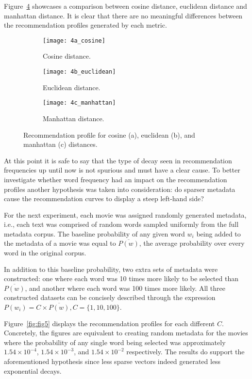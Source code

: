 Figure~\ref{fig:fig4} showcases a comparison between cosine distance, euclidean
distance and manhattan distance. It is clear that there are no meaningful
differences between the recommendation profiles generated by each metric.

\begin{figure}
  \centering
  \begin{subfigure}{0.3\textwidth}
    \centering
    \texttt{[image: 4a\_cosine]}
    \caption{Cosine distance.\label{fig:fig4a}}
  \end{subfigure}
  \begin{subfigure}{0.3\textwidth}
    \centering
    \texttt{[image: 4b\_euclidean]}
    \caption{Euclidean distance.\label{fig:fig4b}}
  \end{subfigure}
  \begin{subfigure}{0.3\textwidth}
    \centering
    \texttt{[image: 4c\_manhattan]}
    \caption{Manhattan distance.\label{fig:fig4c}}
  \end{subfigure}
  \caption{Recommendation profile for cosine (a), euclidean (b), and manhattan
    (c) distances.\label{fig:fig4}}
\end{figure}

At this point it is safe to say that the type of decay seen in recommendation
frequencies up until now is not spurious and must have a clear cause. To better
investigate whether word frequency had an impact on the recommendation profiles
another hypothesis was taken into consideration: do sparser metadata cause the
recommendation curves to display a steep left-hand side?

For the next experiment, each movie was assigned randomly generated metadata,
i.e., each text was comprised of random words sampled uniformly from the full
metadata corpus. The baseline probability of any given word $w_i$ being added to
the metadata of a movie was equal to $\overline{P(w)}$, the average probability
over every word in the original corpus.

In addition to this baseline probability, two extra sets of metadata were
constructed: one where each word was 10 times more likely to be selected than
$\overline{P(w)}$, and another where each word was 100 times more likely. All
three constructed datasets can be concisely described through the expression
$P(w_i) = C \times \overline{P(w)}, C = \{1, 10, 100\}$.

Figure~\ref{fig:fig5} displays the recommendation profiles for each different
$C$. Concretely, the figures are equivalent to creating random metadata for the
movies where the probability of any single word being selected was approximately
$1.54 \times 10^{-4}$, $1.54 \times 10^{-3}$, and $1.54 \times 10^{-2}$
respectively. The results do support the aforementioned hypothesis since less
sparse vectors indeed generated less exponential decays.

